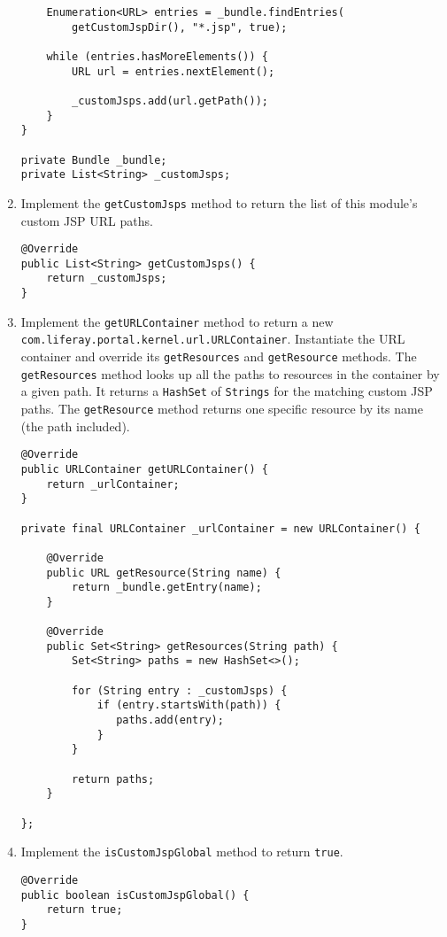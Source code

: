\begin{enumerate}
\begin{verbatim}
    Enumeration<URL> entries = _bundle.findEntries(
        getCustomJspDir(), "*.jsp", true);

    while (entries.hasMoreElements()) {
        URL url = entries.nextElement();

        _customJsps.add(url.getPath());
    }
}

private Bundle _bundle;
private List<String> _customJsps;
\end{verbatim}
\item
  Implement the \texttt{getCustomJsps} method to return the list of this
  module's custom JSP URL paths.

\begin{verbatim}
@Override
public List<String> getCustomJsps() {
    return _customJsps;
}
\end{verbatim}
\item
  Implement the \texttt{getURLContainer} method to return a new
  \texttt{com.liferay.portal.kernel.url.URLContainer}. Instantiate the
  URL container and override its \texttt{getResources} and
  \texttt{getResource} methods. The \texttt{getResources} method looks
  up all the paths to resources in the container by a given path. It
  returns a \texttt{HashSet} of \texttt{Strings} for the matching custom
  JSP paths. The \texttt{getResource} method returns one specific
  resource by its name (the path included).

\begin{verbatim}
@Override
public URLContainer getURLContainer() {
    return _urlContainer;
}

private final URLContainer _urlContainer = new URLContainer() {

    @Override
    public URL getResource(String name) {
        return _bundle.getEntry(name);
    }

    @Override
    public Set<String> getResources(String path) {
        Set<String> paths = new HashSet<>();

        for (String entry : _customJsps) {
            if (entry.startsWith(path)) {
               paths.add(entry);
            }
        }

        return paths;
    }

};
\end{verbatim}
\item
  Implement the \texttt{isCustomJspGlobal} method to return
  \texttt{true}.

\begin{verbatim}
@Override
public boolean isCustomJspGlobal() {
    return true;
}
\end{verbatim}
\end{enumerate}


